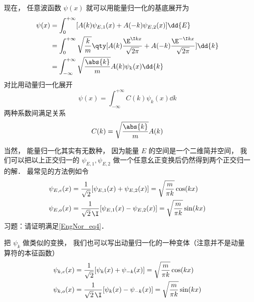 现在， 任意波函数 $\psi(x)$ 就可以用能量归一化的基底展开为%
\begin{equation}
\begin{aligned}
\psi(x) &= \int_0^{+\infty} [A(k) \psi_{E,1}(x) + A(-k) \psi_{E,2}(x)] \dd{E}\\
&= \int_0^{+\infty} \sqrt{\frac{k}{m}}\qty[A(k) \frac{\E^{\I kx}}{\sqrt{2\pi}} + A(-k)\frac{\E^{-\I kx}}{\sqrt{2\pi}}]\dd{k}\\
&= \int_{-\infty}^{+\infty} \sqrt{\frac{\abs{k}}{m}}A(k) \psi_k(x) \dd{k}
\end{aligned}
\end{equation}
对比用动量归一化展开
\begin{equation}
\psi(x) = \int_{-\infty}^{+\infty} C(k)\psi_k(x) \dd{k}
\end{equation}
两种系数间满足关系
\begin{equation}
C(k) = \sqrt{\frac{\abs{k}}{m}}A(k)
\end{equation}

当然， 能量归一化其实有无数种， 因为能量 $E$ 的空间是一个二维简并空间， 我们可以把以上正交归一的 $\psi_{E,1}, \psi_{E,2}$ 做一个任意幺正变换后仍然得到两个正交归一的解． 最常见的方法例如令
\begin{equation}
\begin{aligned}
\psi_{E,e}(x) &= \frac{1}{\sqrt{2}}[\psi_{E,1}(x) + \psi_{E,2}(x)] = \sqrt{\frac{m}{\pi k}}\cos(kx)\\
\psi_{E,o}(x) &= \frac{1}{\sqrt{2}\,\I}[\psi_{E,1}(x) - \psi_{E,2}(x)] = \sqrt{\frac{m}{\pi k}}\sin(kx)
\end{aligned}
\end{equation}
习题：请证明满足\autoref{EngNor_eq4}．

把 $\psi_k$ 做类似的变换， 我们也可以写出动量归一化的一种变体（注意并不是动量算符的本征函数）
\begin{equation}
\begin{aligned}
\psi_{k,e}(x) &= \frac{1}{\sqrt{2}}[\psi_{k}(x) + \psi_{-k}(x)] = \sqrt{\frac{m}{\pi k}}\cos(kx)\\
\psi_{k,o}(x) &= \frac{1}{\sqrt{2}\,\I}[\psi_{k}(x) - \psi_{-k}(x)] = \sqrt{\frac{m}{\pi k}}\sin(kx)
\end{aligned}
\end{equation}
